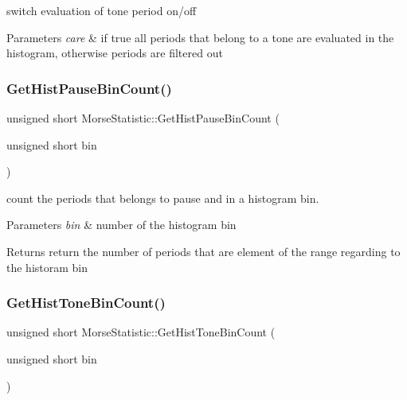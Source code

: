 switch evaluation of tone period on/off 


\begin{DoxyParams}{Parameters}
{\em care} & if true all periods that belong to a tone are evaluated in the histogram, otherwise periods are filtered out \\
\hline
\end{DoxyParams}
\mbox{\label{classMorseStatistic_a4e8fd6695aa502fa339d6a65efb297a7}} 
\subsubsection{\texorpdfstring{Get\+Hist\+Pause\+Bin\+Count()}{GetHistPauseBinCount()}}
{\footnotesize\ttfamily unsigned short Morse\+Statistic\+::\+Get\+Hist\+Pause\+Bin\+Count (\begin{DoxyParamCaption}\item[{unsigned short}]{bin }\end{DoxyParamCaption})}



count the periods that belongs to pause and in a histogram bin. 


\begin{DoxyParams}{Parameters}
{\em bin} & number of the histogram bin \\
\hline
\end{DoxyParams}
\begin{DoxyReturn}{Returns}
return the number of periods that are element of the range regarding to the historam bin 
\end{DoxyReturn}
\mbox{\label{classMorseStatistic_a3467fc7a0aac07feeb1d47805dd603cf}} 
\subsubsection{\texorpdfstring{Get\+Hist\+Tone\+Bin\+Count()}{GetHistToneBinCount()}}
{\footnotesize\ttfamily unsigned short Morse\+Statistic\+::\+Get\+Hist\+Tone\+Bin\+Count (\begin{DoxyParamCaption}\item[{unsigned short}]{bin }\end{DoxyParamCaption})}



